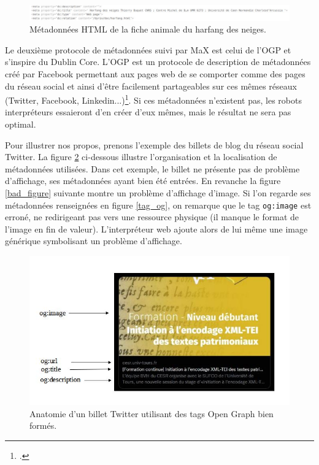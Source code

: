 \documentclass[a4paper,12pt,twoside]{book}
\begin{document}
\begin{figure}[H]
    \centering
    \includegraphics[width=\textwidth,height=\textheight,keepaspectratio]{img/partie_2/metadata_dc_animal.JPG}
    \caption{Métadonnées \acrshort{HTML} de la fiche animale du harfang des neiges.}
    \label{dc_animal}
\end{figure}


Le deuxième protocole de métadonnées suivi par MaX est celui de l'\acrfull{OGP} et s'inspire du Dublin Core. L'\acrshort{OGP} est un protocole de description de métadonnées créé par Facebook permettant aux pages web de se comporter comme des pages du réseau social et ainsi d'être facilement partageables sur ces mêmes réseaux (Twitter, Facebook, Linkedin...)\footcite{OGP}. Si ces métadonnées n'existent pas, les robots interpréteurs essaieront d'en créer d'eux mêmes, mais le résultat ne sera pas optimal.

Pour illustrer nos propos, prenons l'exemple des billets de blog du réseau social Twitter. La figure \ref{twitter} ci-dessous illustre l'organisation et la localisation de métadonnées utilisées. Dans cet exemple, le billet ne présente pas de problème d'affichage, ses métadonnées ayant bien été entrées. En revanche la figure \ref{bad_figure} suivante montre un problème d'affichage d'image. Si l'on regarde ses métadonnées renseignées en figure \ref{tag_og}, on remarque que le tag \texttt{og:image} est erroné, ne redirigeant pas vers une ressource physique (il manque le format de l'image en fin de valeur). L'interpréteur web ajoute alors de lui même une image générique symbolisant un problème d'affichage.

\begin{figure}[H]
    \centering
    \includegraphics[width=12cm]{img/partie_2/exemple_og.JPG}
    \caption{Anatomie d'un billet Twitter utilisant des tags Open Graph bien formés.}
    \label{twitter}
\end{figure}
\end{document}
